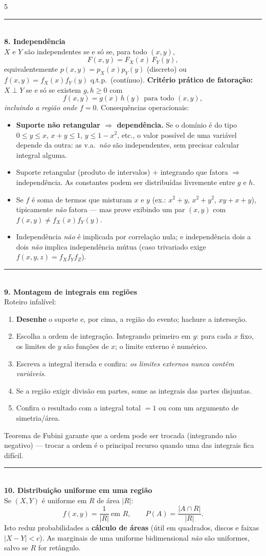 \documentclass[a4paper,8pt]{extarticle}
\newcommand{\tit}[1]{\vspace{2pt}\textcolor{azul}{\rule{\linewidth}{0.6pt}}\\[1pt]\textbf{\textcolor{azul}{#1}}\\[1pt]}
\begin{document}
\begin{multicols*}{5}
\tit{8. Independência}
$X$ e $Y$ são independentes se e só se, para todo $(x,y)$,
\[F(x,y)=F_X(x)\,F_Y(y),\]
equivalentemente $p(x,y)=p_X(x)p_Y(y)$ (discreto) ou $f(x,y)=f_X(x)f_Y(y)$ q.t.p.\ (contínuo).
\textbf{Critério prático de fatoração:} $X\perp Y$ se e só se existem $g,h\ge0$ com
\[f(x,y)=g(x)\,h(y)\ \ \text{para todo }(x,y),\]
\emph{incluindo a região onde $f=0$}. Consequências operacionais:
\begin{itemize}
\item \textbf{Suporte não retangular $\Rightarrow$ dependência.} Se o domínio é do tipo $0\le y\le x$, $x+y\le1$, $y\le 1-x^2$, etc., o valor possível de uma variável depende da outra: as v.a.\ \emph{não} são independentes, sem precisar calcular integral alguma.
\item Suporte retangular (produto de intervalos) $+$ integrando que fatora $\Rightarrow$ independência. As constantes podem ser distribuídas livremente entre $g$ e $h$.
\item Se $f$ é soma de termos que misturam $x$ e $y$ (ex.: $x^2+y$, $x^2+y^2$, $xy+x+y$), tipicamente \emph{não} fatora — mas prove exibindo um par $(x,y)$ com $f(x,y)\ne f_X(x)f_Y(y)$.
\item Independência \emph{não} é implicada por correlação nula; e independência dois a dois \emph{não} implica independência mútua (caso trivariado exige $f(x,y,z)=f_X f_Y f_Z$).
\end{itemize}

\tit{9. Montagem de integrais em regiões}
Roteiro infalível:
\begin{enumerate}
\item \textbf{Desenhe} o suporte e, por cima, a região do evento; hachure a interseção.
\item Escolha a ordem de integração. Integrando primeiro em $y$: para cada $x$ fixo, os limites de $y$ são funções de $x$; o limite externo é numérico.
\item Escreva a integral iterada e confira: \emph{os limites externos nunca contêm variáveis}.
\item Se a região exigir divisão em partes, some as integrais das partes disjuntas.
\item Confira o resultado com a integral total $=1$ ou com um argumento de simetria/área.
\end{enumerate}
Teorema de Fubini garante que a ordem pode ser trocada (integrando não negativo) — trocar a ordem é o principal recurso quando uma das integrais fica difícil.

\tit{10. Distribuição uniforme em uma região}
Se $(X,Y)$ é uniforme em $R$ de área $|R|$:
\[f(x,y)=\frac{1}{|R|}\ \text{em }R,\qquad P(A)=\frac{|A\cap R|}{|R|}.\]
Isto reduz probabilidades a \textbf{cálculo de áreas} (útil em quadrados, discos e faixas $|X-Y|<c$). As marginais de uma uniforme bidimensional \emph{não} são uniformes, salvo se $R$ for retângulo.


\end{multicols*}
\end{document}

